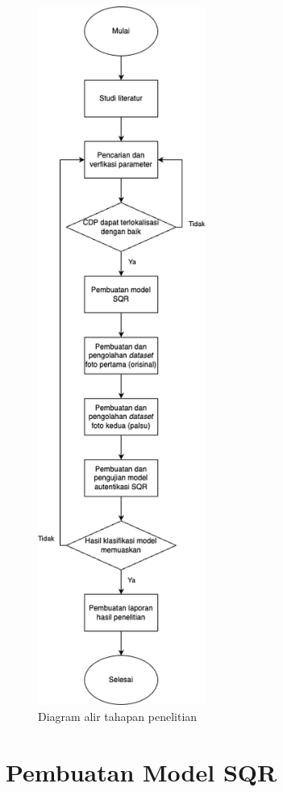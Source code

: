 \begin{figure}[h]
	\centering
	\includegraphics[width=5.5cm]{contents/chapter-3/3-flowchartfix.png}
	\caption{Diagram alir tahapan penelitian}
	\label{Fig: 3-diagramalirpenelitian}
\end{figure}

\clearpage

\section{Pembuatan Model SQR}
